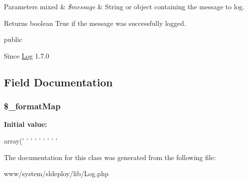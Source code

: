 \begin{DoxyParams}[1]{Parameters}
mixed & {\em \$message} & String or object containing the message to log.\\
\hline
\end{DoxyParams}
\begin{DoxyReturn}{Returns}
boolean True if the message was successfully logged.
\end{DoxyReturn}
public \begin{DoxySince}{Since}
\hyperlink{class_log}{Log} 1.7.0 
\end{DoxySince}


\subsection{Field Documentation}
\hypertarget{class_log_acadcb06ba7707968a0f236295472f370}{
\subsubsection[{\$\_\-formatMap}]{\setlength{\rightskip}{0pt plus 5cm}\$\_\-formatMap}}
\label{class_log_acadcb06ba7707968a0f236295472f370}
{\bfseries Initial value:}
\begin{DoxyCode}
 array('%
                            '%
                            '%
                            '%
                            '%
                            '%
                            '%
                            '%
                            '%
\end{DoxyCode}


The documentation for this class was generated from the following file:\begin{DoxyCompactItemize}
\item 
www/system/sldeploy/lib/Log.php\end{DoxyCompactItemize}
